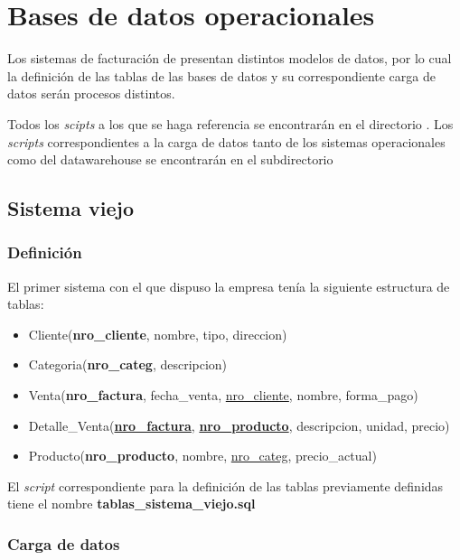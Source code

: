 \section{Bases de datos operacionales}

Los sistemas de facturación de  presentan distintos modelos de datos, por lo cual la definición de las tablas de las bases de datos y su correspondiente carga de datos serán procesos distintos.

Todos los \emph{scipts} a los que se haga referencia se encontrarán en el directorio \textbf{}. Los \emph{scripts} correspondientes a la carga de datos tanto de los sistemas operacionales como del datawarehouse se encontrarán en el subdirectorio \textbf{}   

\subsection{Sistema viejo}

\subsubsection{Definición}

El primer sistema con el que dispuso la empresa tenía la siguiente estructura de tablas:

\begin{itemize}
    \item Cliente(\textbf{nro\_cliente}, nombre, tipo, direccion)
    \item Categoria(\textbf{nro\_categ}, descripcion)
    \item Venta(\textbf{nro\_factura}, fecha\_venta, \underline{nro\_cliente}, nombre, forma\_pago)
    \item Detalle\_Venta(\underline{\textbf{nro\_factura}}, \underline{\textbf{nro\_producto}}, descripcion, unidad, precio)
    \item Producto(\textbf{nro\_producto}, nombre, \underline{nro\_categ}, precio\_actual)
\end{itemize}

El \emph{script} correspondiente para la definición de las tablas previamente definidas tiene el nombre \textbf{tablas\_sistema\_viejo.sql} 

\subsubsection{Carga de datos}

